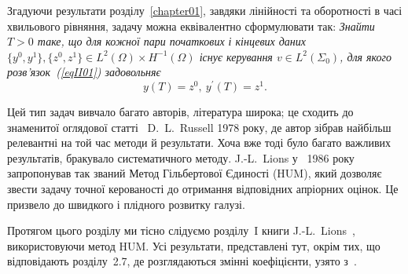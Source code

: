 \begin{remark}
\label{remark:II.2.2}
Згадуючи результати розділу~\ref{chapter01}, завдяки лінійності та оборотності в часі хвильового рівняння, задачу можна еквівалентно сформулювати так: \emph{Знайти $T>0$ таке, що для кожної пари початкових і кінцевих даних $\{y^0, y^1\}, \{z^0, z^1\} \in L^2(\Omega) \times H^{-1}(\Omega)$ існує керування $v \in L^2(\Sigma_0)$, для якого розв'язок~(\ref{eqII01}) задовольняє}
\begin{equation}\label{eqII03}
y(T) = z^0,\ y^\prime(T) =z^1.
\end{equation}

Цей тип задач вивчало багато авторів, література широка; це сходить до знаменитої оглядової статті~\cite{russell1978control} D.~L.~Russell 1978 року, де автор зібрав найбільш релевантні на той час методи й результати. Хоча вже тоді було багато важливих результатів, бракувало систематичного методу. J.-L.~Lions у~\cite{lions1986controlabilite} 1986 року запропонував так званий Метод Гільбертової Єдиності (HUM), який дозволяє звести задачу точної керованості до отримання відповідних апріорних оцінок. Це призвело до швидкого і плідного розвитку галузі.

Протягом цього розділу ми тісно слідуємо розділу~I книги J.-L.~Lions~\cite{lions1988controlabilite}, використовуючи метод HUM. Усі результати, представлені тут, окрім тих, що відповідають розділу~2.7, де розглядаються змінні коефіцієнти, узято з~\cite{lions1988controlabilite}.


\end{remark}
